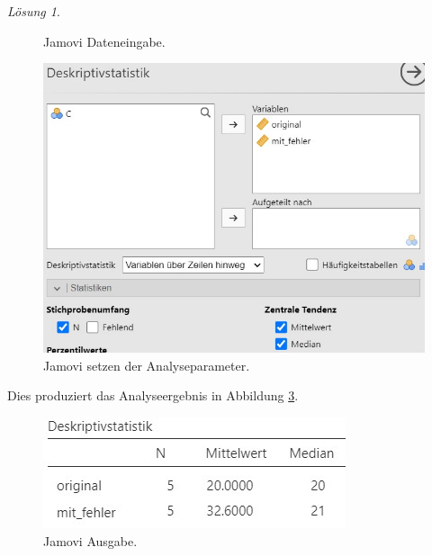 \documentclass[
]{book}
\theoremstyle{definition}
\theoremstyle{definition}
\theoremstyle{definition}
\theoremstyle{definition}
\theoremstyle{remark}
\newtheorem*{solution}{Lösung}
\begin{document}
\begin{solution}
\begin{figure}
{}

\caption{Jamovi Dateneingabe.}\label{fig:sol-theorie-mdn-mean-data}
\end{figure}

\begin{figure}

{\centering \includegraphics[width=1\linewidth]{figures/02-exr-theorie-mdn-mean-jmv-input} 

}

\caption{Jamovi setzen der Analyseparameter.}\label{fig:sol-theorie-mdn-mean-input}
\end{figure}

Dies produziert das Analyseergebnis in Abbildung \ref{fig:sol-theorie-mdn-mean-output}.

\begin{figure}

{\centering \includegraphics[width=1\linewidth]{figures/02-exr-theorie-mdn-mean-jmv-output} 

}

\caption{Jamovi Ausgabe.}\label{fig:sol-theorie-mdn-mean-output}
\end{figure}


\end{solution}
\end{document}
